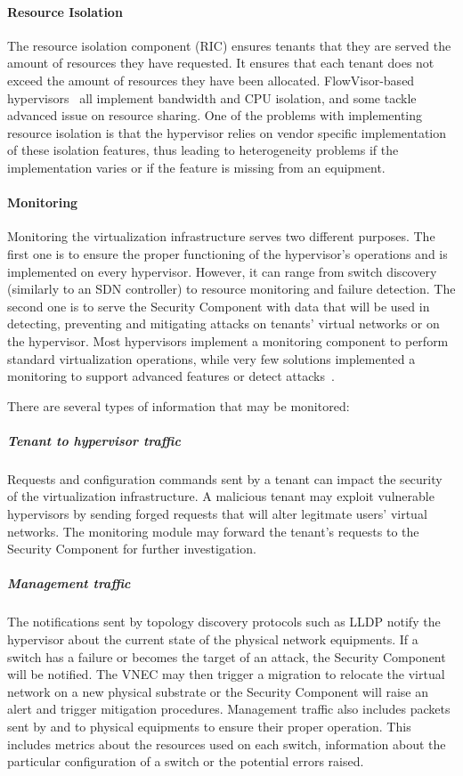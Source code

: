 \paragraph{Resource Isolation}
The resource isolation component (RIC) ensures tenants that they are served the amount of resources they have requested.
It ensures that each tenant does not exceed the amount of resources they have been allocated.
FlowVisor-based hypervisors~\cite{FlowVisor-Sherwood2009,ADVisor-Salvadori2012,VeRTIGO-Corin2012a,EnhancedFV-Min2012,SlicesIsolator-El-Azzab2011,DoubleFV-Yin2013} all implement bandwidth and CPU isolation, and some tackle advanced issue on resource sharing. One of the problems with implementing resource isolation is that the hypervisor relies on vendor specific implementation of these isolation features, thus leading to heterogeneity problems if the implementation varies or if the feature is missing from an equipment.


\paragraph{Monitoring}
Monitoring the virtualization infrastructure serves two different purposes.
The first one is to ensure the proper functioning of the hypervisor's operations and is implemented on every hypervisor. However, it can range from switch discovery (similarly to an SDN controller) to resource monitoring and failure detection.
The second one is to serve the Security Component with data that will be used in detecting, preventing and mitigating attacks on tenants' virtual networks or on the hypervisor.
Most hypervisors implement a monitoring component to perform standard virtualization operations, while very few solutions implemented a monitoring to support advanced features or detect attacks~\cite{VeRTIGO-Corin2012a,CoVisor-Jin2015,FlowN-Drutskoy2012,AutoSlice-Bozakov2012,NVP-Koponen2014,ONVisor-Han2018}.

There are several types of information that may be monitored:

\subparagraph{Tenant to hypervisor traffic} Requests and configuration commands sent by a tenant can impact the security of the virtualization infrastructure. A malicious tenant may exploit vulnerable hypervisors by sending forged requests that will alter legitmate users' virtual networks. The monitoring module may forward the tenant's requests to the Security Component for further investigation.

\subparagraph{Management traffic} 
The notifications sent by topology discovery protocols such as LLDP notify the hypervisor about the current state of the physical network equipments. If a switch has a failure or becomes the target of an attack, the Security Component will be notified. The VNEC may then trigger a migration to relocate the virtual network on a new physical substrate or the Security Component will raise an alert and trigger mitigation procedures.
Management traffic also includes packets sent by and to physical equipments to ensure their proper operation.
This includes metrics about the resources used on each switch, information about the particular configuration of a switch or the potential errors raised.


